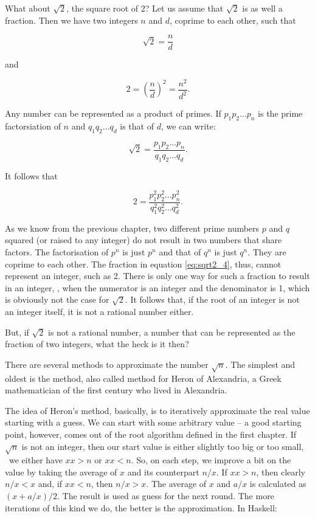 \documentclass[tikz]{scrreprt}
\begin{document}
What about $\sqrt{2}$, the square root of 2?
Let us assume that $\sqrt{2}$ is as well a fraction.
Then we have two integers $n$ and $d$,
coprime to each other, such that

\begin{equation}
\sqrt{2} = \frac{n}{d}
\end{equation}

and

\begin{equation}
2 = \left(\frac{n}{d}\right)^2 = \frac{n^2}{d^2}.
\end{equation}

Any number can be represented as a product of primes.
If $p_1p_2\dots p_n$ is the prime factorsiation of $n$
and $q_1q_2\dots q_d$ is that of $d$,
we can write:

\begin{equation}
\sqrt{2} = \frac{p_1p_2\dots p_n}{q_1q_2\dots q_d}.
\end{equation}

It follows that 

\begin{equation}\label{eq:sqrt2_4}
2 = \frac{p_1^2p_2^2\dots p_n^2}{q_1^2q_2^2\dots q_d^2}.
\end{equation}

As we know from the previous chapter,
two different prime numbers $p$ and $q$ squared 
(or raised to any integer)
do not result in two numbers that share factors.
The factorisation of $p^n$ is just $p^n$ and that
of $q^n$ is just $q^n$. They are coprime to each other.
The fraction in equation \ref{eq:sqrt2_4}, thus,
cannot represent an integer, such as 2.
There is only one way for such a fraction to
result in an integer, \viz, 
when the numerator is an integer and the denominator is 1,
which is obviously not the case for $\sqrt{2}$.
It follows that, if the root of an integer is not an integer itself,
it is not a rational number either.

But, if $\sqrt{2}$ is not a rational number,
a number that can be represented as the fraction
of two integers, what the heck is it then?

There are several methods to approximate the number $\sqrt{n}$.
The simplest and oldest is the  method,
also called  method for Heron of Alexandria,
a Greek mathematician of the first century who lived in 
Alexandria.

The idea of Heron's method, basically, is to
iteratively approximate the real value starting with a guess.
We can start with some arbitrary value --
a good starting point, however, 
comes out of the root algorithm defined in the first chapter.
If $\sqrt{n}$ is not an integer, then our start value
is either slightly too big or too small,
\ie\ we either have $xx > n$ or $xx < n$.
So, on each step, we improve a bit on the value
by taking the average of $x$ and its counterpart $n/x$.
If $xx > n$, then clearly $n/x < x$ and, 
if $xx < n$, then $n/x > x$.
The average of $x$ and $a/x$ is calculated as
$(x+a/x)/2$. The result is used as guess for the next round.
The more iterations of this kind we do,
the better is the approximation. In Haskell:
\end{document}
